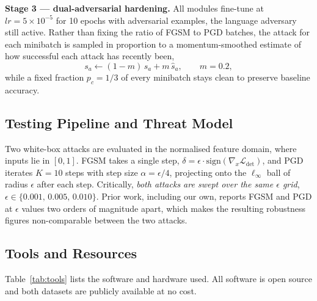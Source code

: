 \documentclass[conference]{IEEEtran}
\newcommand{\Loss}{\mathcal{L}}
\begin{document}
\textbf{Stage 3 --- dual-adversarial hardening.} All modules fine-tune at
$lr = 5 \times 10^{-5}$ for 10 epochs with adversarial examples, the language
adversary still active. Rather than fixing the ratio of FGSM to PGD batches,
the attack for each minibatch is sampled in proportion to a momentum-smoothed
estimate of how successful each attack has recently been,
\begin{equation}
s_a \leftarrow (1 - m)\, s_a + m\, \hat{s}_a, \qquad m = 0.2,
\end{equation}
while a fixed fraction $p_c = 1/3$ of every minibatch stays clean to preserve
baseline accuracy.

\subsection{Testing Pipeline and Threat Model}
\label{sec:threat}
Two white-box attacks are evaluated in the normalised feature domain, where
inputs lie in $[0,1]$. FGSM \cite{goodfellow2015fgsm} takes a single step,
$\delta = \epsilon \cdot \mathrm{sign}(\nabla_x \Loss_{\mathrm{det}})$, and
PGD \cite{madry2018pgd} iterates $K = 10$ steps with step size
$\alpha = \epsilon / 4$, projecting onto the $\ell_\infty$ ball of radius
$\epsilon$ after each step. Critically, \emph{both attacks are swept over the
same $\epsilon$ grid}, $\epsilon \in \{0.001,\, 0.005,\, 0.010\}$. Prior work,
including our own, reports FGSM and PGD at $\epsilon$ values two orders of
magnitude apart, which makes the resulting robustness figures non-comparable
between the two attacks.

\subsection{Tools and Resources}
Table~\ref{tab:tools} lists the software and hardware used. All software is
open source and both datasets are publicly available at no cost.
\end{document}
